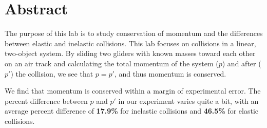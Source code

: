 \section*{Abstract}

The purpose of this lab is to study conservation of momentum and the differences between elastic and inelastic collisions. This lab focuses on collisions in a linear, two-object system. By sliding two gliders with known masses toward each other on an air track and calculating the total momentum of the system ($p$) and after ($p'$) the collision, we see that $p = p'$, and thus momentum is conserved.

\bigskip

We find that momentum is conserved within a margin of experimental error. The percent difference between $p$ and $p'$ in our experiment varies quite a bit, with an average percent difference of \textbf{17.9\%} for inelastic collisions and \textbf{46.5\%} for elastic collisions.